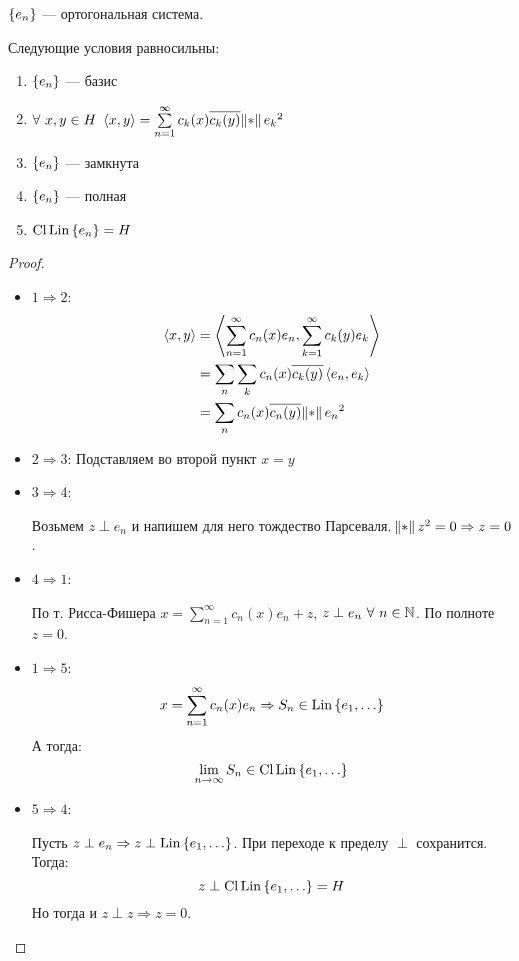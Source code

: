 \begin{theorem}
    $\set{e_n}$ --- ортогональная система.

    Следующие условия равносильны:
    \begin{enumerate}
        \item $\set{e_n}$ --- базис
        \item $\forall\ x, y \in H\ \dotprod{x}{y} = \sum\limits_{n=1}^\infty c_k(x)\conjj{c_k(y)} \norm{e_k}^2$
        \item $\set{e_n}$ --- замкнута
        \item $\set{e_n}$ ---  полная
        \item $\operatorname{Cl} \operatorname{Lin} \set{e_n} = H$
    \end{enumerate}
\end{theorem}
\begin{proof} $ $
    \begin{itemize}
        \item $1 \Rightarrow 2$:
        \begin{align*}
            \dotprod{x}{y} &= \dotprod{\sum\limits_{n=1}^\infty c_n(x)e_n}{\sum\limits_{k=1}^\infty c_k(y) e_k} \\ 
            &= \sum\limits_n \sum\limits_k c_n(x) \conjj{c_k(y)} \dotprod{e_n}{e_k} \\ 
            &= \sum\limits_n c_n(x) \conjj{c_n(y)} \norm{e_n}^2
        \end{align*}
        \item $2 \Rightarrow 3$: Подставляем во второй пункт $x = y$
        \item $3 \Rightarrow 4$:

        Возьмем $z \perp e_n$ и напишем для него тождество Парсеваля. $\norm{z}^2 = 0 \Rightarrow z = 0$.
        \item $4 \Rightarrow 1$:

        По т. Рисса-Фишера $x = \sum\limits_{n=1}^\infty c_n(x) e_n + z$, $z \perp e_n \ \forall\ n \in \mathbb{N}$.
        По полноте $z = 0$.
        \item $1 \Rightarrow 5$:
        $$x = \sum\limits_{n=1}^\infty c_n(x) e_n \Rightarrow S_n \in \operatorname{Lin} \set{e_1, \ldots}$$
        А тогда:
        $$\lim_{n \to \infty} S_n \in \operatorname{Cl} \operatorname{Lin} \set{e_1, \ldots}$$
        \item $5 \Rightarrow 4$:

        Пусть $z \perp e_n \Rightarrow z \perp \operatorname{Lin} \set{e_1, \ldots}$.
        При переходе к пределу $\perp$ сохранится. Тогда: 
        $$z \perp \operatorname{Cl} \operatorname{Lin} \set{e_1, \ldots} = H$$
        Но тогда и $z \perp z \Rightarrow z = 0$.
    \end{itemize}
\end{proof}

\newpage

